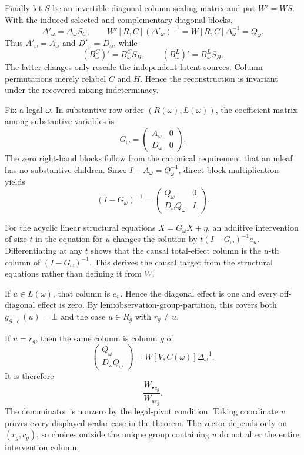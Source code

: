 Finally let \(S\) be an invertible diagonal column-scaling matrix and put \(W'=WS\).  With the induced selected and complementary diagonal blocks,
\[
\Delta'_\omega=\Delta_\omega S_C,
\qquad
W'[R,C](\Delta'_\omega)^{-1}=W[R,C]\Delta_\omega^{-1}=Q_\omega.
\]
Thus \(A'_\omega=A_\omega\) and \(D'_\omega=D_\omega\), while
\[
(B^C_\omega)'=B^C_\omega S_H,
\qquad
(B^L_\omega)'=B^L_\omega S_H.
\]
The latter changes only rescale the independent latent sources.  Column permutations merely relabel \(C\) and \(H\).  Hence the reconstruction is invariant under the recovered mixing indeterminacy.

Fix a legal \(\omega\).  In substantive row order \((R(\omega),L(\omega))\), the coefficient matrix among substantive variables is
\[
G_\omega=
\begin{pmatrix}
A_\omega&0\\
D_\omega&0
\end{pmatrix}.
\]
The zero right-hand blocks follow from the canonical requirement that an mleaf has no substantive children.  Since \(I-A_\omega=Q_\omega^{-1}\), direct block multiplication yields
\[
(I-G_\omega)^{-1}
=
\begin{pmatrix}
Q_\omega&0\\
D_\omega Q_\omega&I
\end{pmatrix}.
\]

For the acyclic linear structural equations \(X=G_\omega X+\eta\), an additive intervention of size \(t\) in the equation for \(u\) changes the solution by \(t(I-G_\omega)^{-1}e_u\).  Differentiating at any \(t\) shows that the causal total-effect column is the \(u\)-th column of \((I-G_\omega)^{-1}\).  This derives the causal target from the structural equations rather than defining it from \(W\).

If \(u\in L(\omega)\), that column is \(e_u\).  Hence the diagonal effect is one and every off-diagonal effect is zero.  By \(\text{lem:observation-group-partition}\), this covers both \(g_{\mathcal G,\ell}(u)=\bot\) and the case \(u\in R_g\) with \(r_g\ne u\).

If \(u=r_g\), then the same column is column \(g\) of
\[
\begin{pmatrix}Q_\omega\\D_\omega Q_\omega\end{pmatrix}
=W[V,C(\omega)]\Delta_\omega^{-1}.
\]
It is therefore
\[
\frac{W_{\bullet c_g}}{W_{uc_g}}.
\]
The denominator is nonzero by the legal-pivot condition.  Taking coordinate \(v\) proves every displayed scalar case in the theorem.  The vector depends only on \((r_g,c_g)\), so choices outside the unique group containing \(u\) do not alter the entire intervention column.

